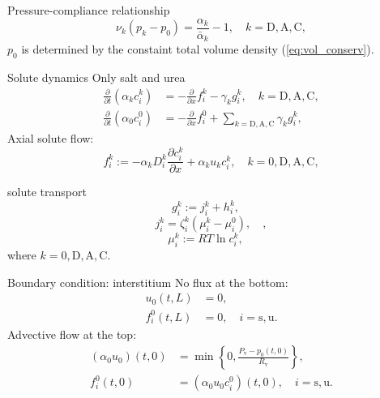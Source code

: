 \documentclass{beamer}
\begin{document}
\begin{frame}{Pressure-compliance relationship}
    \begin{equation}
        \nu_k(p_k - p_0) = \frac{\alpha_k}{\bar{\alpha}_k} - 1,\quad k=\mathrm{D},\mathrm{A},\mathrm{C},
    \end{equation}
    $p_0$ is determined by the constaint total volume density (\ref{eq:vol_conserv}).
\end{frame}

\begin{frame}{Solute dynamics}
    Only salt and urea
    \begin{align}\label{eq:solute_dynamics}
        \frac{\partial}{\partial t}\left( \alpha_k c_i^k \right)&=-\frac{\partial}{\partial x} f_i^k - \gamma_kg_i^k,\quad k=\mathrm{D},\mathrm{A},\mathrm{C},\\
        \frac{\partial}{\partial t}\left( \alpha_0 c_i^0 \right)&=-\frac{\partial}{\partial x} f_i^0 + \sum_{k=\mathrm{D},\mathrm{A},\mathrm{C}} \gamma_k g_i^k,
    \end{align}
    \pause
    Axial solute flow:
    \begin{equation}
        f_i^k := -\alpha_kD_i^k\frac{\partial c_i^k}{\partial x}+\alpha_ku_kc_i^k,\quad k=0,\mathrm{D},\mathrm{A},\mathrm{C},
    \end{equation}
\end{frame}

\begin{frame}{solute transport}
    \begin{equation}
        g_i^k := j_i^k+h_i^k,\quad 
    \end{equation}
    \begin{equation}
        j_i^k = \zeta_i^k\left( \mu_i^k - \mu_i^0 \right),\quad ,
    \end{equation}
    \begin{equation}
        \mu_i^k:= RT\ln c_i^k,\quad 
    \end{equation}
    where $k=0,\mathrm{D},\mathrm{A},\mathrm{C}$.
\end{frame}

\begin{frame}{Boundary condition: interstitium}
    No flux at the bottom:
    \begin{align}
        u_0(t,L) &= 0,\\ 
        f_i^0(t,L)&=0,\quad i=\mathrm{s},\mathrm{u}.
    \end{align}
    Advective flow at the top:
    \begin{align}
        (\alpha_0u_0)(t,0) &= \min\left\{ 0,\frac{P_{\mathrm{v}}-p_0(t,0) }{R_{\mathrm{v}}}\right\},\\ 
        f_i^0(t,0) &= (\alpha_0 u_0 c_i^0)(t,0),\quad i=\mathrm{s},\mathrm{u}.
    \end{align}
\end{frame}
\end{document}
